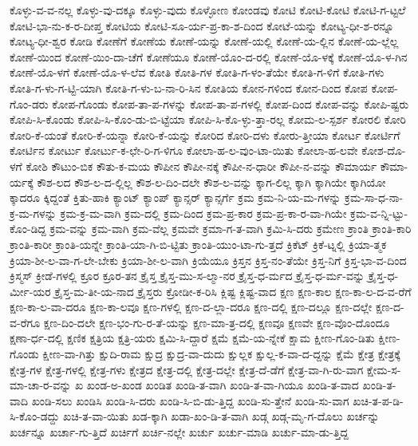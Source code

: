 {ಕೊಳ್ಳು-ವ-ವ-ನಲ್ಲ
ಕೊಳ್ಳು-ವು-ದಕ್ಕೂ
ಕೊಳ್ಳು-ವುದು
ಕೊಳ್ಳೋಣ
ಕೋಂಡವು
ಕೋಟಿ
ಕೋಟಿ-ಕೋಟಿ
ಕೋಟಿ-ಗ-ಟ್ಟಲೆ
ಕೋಟಿ-ಭಾ-ನು-ಕ-ರ-ದೀಪ್ತ
ಕೋಟಿಯ
ಕೋಟಿ-ಸೂ-ರ್ಯ-ಪ್ರ-ಕಾ-ಶ-ದಿಂದ
ಕೋಟೆ-ಯನ್ನು
ಕೋಟ್ಯ-ಧೀ-ಶ-ರನ್ನೂ
ಕೋಟ್ಯ-ಧೀ-ಶ್ವರ
ಕೋಡಿ
ಕೋಣೆಗೆ
ಕೋಣೆಯ
ಕೋಣೆ-ಯನ್ನು
ಕೋಣೆ-ಯಲ್ಲಿ
ಕೋಣೆ-ಯ-ಲ್ಲಿನ
ಕೋಣೆ-ಯ-ಲ್ಲೆಲ್ಲ
ಕೋಣೆ-ಯಿಂದ
ಕೋಣೆ-ಯಿಂ-ದಾ-ಚೆಗೆ
ಕೋಣೆಯೂ
ಕೋಣೆ-ಯೊಂ-ದ-ರಲ್ಲಿ
ಕೋಣೆ-ಯೊ-ಳಕ್ಕೆ
ಕೋಣೆ-ಯೊ-ಳ-ಗಿನ
ಕೋಣೆ-ಯೊ-ಳಗೆ
ಕೋಣೆ-ಯೊ-ಳ-ಲೆವ
ಕೋತಿ
ಕೋತಿ-ಗಳ
ಕೋತಿ-ಗ-ಳಂ-ತೆಯೇ
ಕೋತಿ-ಗ-ಳಿಗೆ
ಕೋತಿ-ಗಳು
ಕೋತಿ-ಗ-ಳು-ಗ-ಟ್ಟಿ-ಯಾಗಿ
ಕೋತಿ-ಗ-ಳು-ಬ-ನಾ-ರಿ-ಸಿನ
ಕೋತಿಯ
ಕೋನ-ಗಳಿಂದ
ಕೋನ-ದಿಂದ
ಕೋಪ
ಕೋಪ-ಗೊಂ-ಡರು
ಕೋಪ-ಗೊಂಡು
ಕೋಪ-ತಾ-ಪ-ಗಳನ್ನು
ಕೋಪ-ತಾ-ಪ-ಗಳಲ್ಲಿ
ಕೋಪ-ದಿಂದ
ಕೋಪ-ವನ್ನು
ಕೋಪಿ-ಷ್ಟರು
ಕೋಪಿ-ಸಿ-ಕೊಂಡು
ಕೋಪಿ-ಸಿ-ಕೊಂ-ಡು-ಬಿ-ಟ್ಟೆಯಾ
ಕೋಪಿ-ಸಿ-ಕೊ-ಳ್ಳು-ತ್ತಾ-ರಲ್ಲ
ಕೋಮ-ಲ-ಸ್ಪರ್ಶ
ಕೋರಲಿ
ಕೋರಿ
ಕೋರಿ-ಕೆ-ಯಂತೆ
ಕೋರಿ-ಕೆ-ಯನ್ನಾ
ಕೋರಿ-ಕೆ-ಯನ್ನು
ಕೋರಿದ
ಕೋರಿ-ದಳು
ಕೋರು-ತ್ತೀಯಾ
ಕೋರ್ಟ
ಕೋರ್ಟಿಗೆ
ಕೋರ್ಟಿನ
ಕೋರ್ಟು
ಕೋರ್ಟು-ಕ-ಛೇ-ರಿ-ಗ-ಳಿಗೂ
ಕೋಲಾ-ಹ-ಲ-ವುಂ-ಟಾ-ಯಿತು
ಕೋಲಾ-ಹ-ಲವೇ
ಕೋಶ-ದೊ-ಳಗೆ
ಕೋಶಿ
ಕೌಟುಂ-ಬಿಕ
ಕೌತು-ಕ-ಮಯ
ಕೌಪೀನ
ಕೌಪೀ-ನಕ್ಕೆ
ಕೌಪೀ-ನ-ಧಾರೀ
ಕೌಪೀ-ನ-ವನ್ನು
ಕೌಮಾರ್ಯ
ಕೌಮಾ-ರ್ಯಕ್ಕೆ
ಕೌಶ-ಲದ
ಕೌಶ-ಲ-ದ-ಲ್ಲಿಲ್ಲ
ಕೌಶ-ಲ-ದಿಂ-ದಲೇ
ಕೌಶ-ಲ-ವನ್ನು
ಕ್ಕಾಗ-ಲಿಲ್ಲ
ಕ್ಕಾಗಿ
ಕ್ಕಾಗಿಯೇ
ಕ್ಕಾಗಿಯೋ
ಕ್ಕಾದರೂ
ಕ್ಕಿದ್ದಂತೆ
ಕ್ತಿತು-ಹಾಕಿ
ಕ್ಯಾಂಟ್
ಕ್ಯಾಂಪ್
ಕ್ಯಾನ್ಸರ್
ಕ್ಯಾನ್ಸರ್ಗೆ
ಕ್ರಮ
ಕ್ರಮ-ನಿ-ಯ-ಮ-ಗಳನ್ನು
ಕ್ರಮ-ಸಾ-ಧ-ನಾ-ಕ್ರ-ಮ-ಗಳನ್ನು
ಕ್ರಮ-ಕ್ರ-ಮ-ವಾಗಿ
ಕ್ರಮ-ದಲ್ಲಿ
ಕ್ರಮ-ದಿಂದ
ಕ್ರಮ-ಪ್ರ-ಕಾರ
ಕ್ರಮ-ಪ್ರ-ಕಾ-ರ-ವಾ-ಗಿಯೇ
ಕ್ರಮ-ವ-ನ್ನಿ-ಟ್ಟು-ಕೊಂ-ಡಿದ್ದ
ಕ್ರಮ-ವನ್ನು
ಕ್ರಮ-ವಾಗಿ
ಕ್ರಮ-ವೆಲ್ಲ
ಕ್ರಮವೇ
ಕ್ರಮಾ-ಗ-ತ-ವಾಗಿ
ಕ್ರಮಿ-ಸಿ-ದರು
ಕ್ರಮೇಣ
ಕ್ರಾಂತಿ
ಕ್ರಾಂತಿ-ಕಾರಿ
ಕ್ರಾಂತಿ-ಕಾರೀ
ಕ್ರಾಂತಿ-ಯನ್ನೇ
ಕ್ರಾಂತಿ-ಯಾ-ಗಿ-ಬಿ-ಟ್ಟಿತು
ಕ್ರಾಂತಿ-ಯುಂ-ಟಾ-ಗು-ತ್ತದೆ
ಕ್ರಿಕೆಟ್
ಕ್ರಿಕೆ-ಟ್ನಲ್ಲಿ
ಕ್ರಿಯಾ-ತ್ಮಕ
ಕ್ರಿಯಾ-ಶೀ-ಲ-ವಾ-ಗ-ಲೇ-ಬೇಕು
ಕ್ರಿಯಾ-ಶೀ-ಲ-ವಾಗಿ
ಕ್ರಿಯೆಯೂ
ಕ್ರಿಸ್ತನ
ಕ್ರಿಸ್ತ-ನಂ-ತೆಯೇ
ಕ್ರಿಸ್ತ-ನಿಗೆ
ಕ್ರಿಸ್ತ-ಭಾ-ವ-ದಿಂದ
ಕ್ರಿಸ್ಮಸ್
ಕ್ರೀಡೆ-ಗಳಲ್ಲಿ
ಕ್ರೂರ
ಕ್ರೂರ-ತನ
ಕ್ರೈಸ್ತ
ಕ್ರೈಸ್ತ-ಮು-ಸ-ಲ್ಮಾ-ನರ
ಕ್ರೈಸ್ತ-ಧ-ರ್ಮದ
ಕ್ರೈಸ್ತ-ಧ-ರ್ಮ-ವನ್ನು
ಕ್ರೈಸ್ತ-ಧ-ರ್ಮೀ-ಯರ
ಕ್ರೈಸ್ತ-ಮ-ತೀ-ಯ-ನಾದ
ಕ್ರೈಸ್ತರು
ಕ್ರೋಡೀ-ಕ-ರಿಸಿ
ಕ್ಲಿಷ್ಟ
ಕ್ಲಿಷ್ಟ-ವಾದ
ಕ್ಷಣ
ಕ್ಷಣ-ಕಾಲ
ಕ್ಷಣ-ಕಾ-ಲ-ದ-ವ-ರೆಗೆ
ಕ್ಷಣ-ಕಾ-ಲ-ವಾ-ದರೂ
ಕ್ಷಣ-ಕಾ-ಲವೂ
ಕ್ಷಣ-ಗಳಲ್ಲಿ
ಕ್ಷಣ-ದ-ಲ್ಲಾ-ದರೂ
ಕ್ಷಣ-ದಲ್ಲಿ
ಕ್ಷಣ-ದಲ್ಲೂ
ಕ್ಷಣ-ದಲ್ಲೇ
ಕ್ಷಣ-ದ-ವ-ರೆಗೂ
ಕ್ಷಣ-ದಿಂ-ದಲೇ
ಕ್ಷಣ-ಭಂ-ಗು-ರ-ತೆ-ಯನ್ನು
ಕ್ಷಣ-ಮಾ-ತ್ರ-ದಲ್ಲಿ
ಕ್ಷಣವೂ
ಕ್ಷಣವೇ
ಕ್ಷಣ-ವೊಂ-ದೊಂದೂ
ಕ್ಷಣಾ-ರ್ಧ-ದಲ್ಲಿ
ಕ್ಷಣಿಕ
ಕ್ಷತ್ರಿಯ
ಕ್ಷತ್ರಿ-ಯರು
ಕ್ಷಮಿ-ಸಿ-ದ್ದಾರೆ
ಕ್ಷಮೆ
ಕ್ಷಮೆ-ಯ-ನ್ನೇಕೆ
ಕ್ಷಾಮ
ಕ್ಷೀಣ-ಗೊಂ-ಡಿತು
ಕ್ಷೀಣ-ಗೊಂಡು
ಕ್ಷೀಣ-ವಾ-ಗಿತ್ತು
ಕ್ಷುದಿ-ರಾಮ
ಕ್ಷುದ್ರ
ಕ್ಷುದ್ರ-ವಾ-ದುದು
ಕ್ಷುಲ್ಲಕ
ಕ್ಷುಲ್ಲ-ಕ-ವಾ-ದ-ದ್ದನ್ನು
ಕ್ಷೆಮೆ
ಕ್ಷೇತ್ರ
ಕ್ಷೇತ್ರಕ್ಕೆ
ಕ್ಷೇತ್ರ-ಗಳ
ಕ್ಷೇತ್ರ-ಗಳಲ್ಲಿ
ಕ್ಷೇತ್ರ-ಗಳು
ಕ್ಷೇತ್ರದ
ಕ್ಷೇತ್ರ-ದಲ್ಲಿ
ಕ್ಷೇತ್ರ-ದಲ್ಲೇ
ಕ್ಷೇತ್ರ-ದೆ-ಡೆಗೆ
ಕ್ಷೇತ್ರ-ವಾ-ಗಿ-ರು-ವಾಗ
ಕ್ಷೇಮ-ಸ-ಮಾ-ಚಾ-ರ-ವನ್ನು
ಖ
ಖಂಡ-ಅ-ಖಂಡ
ಖಂಡಿತ
ಖಂಡಿ-ತ-ವಾಗಿ
ಖಂಡಿ-ತ-ವಾ-ಗಿಯೂ
ಖಂಡಿ-ತ-ವಾದ
ಖಂಡಿ-ತ-ವಾದಿ
ಖಂಡಿ-ಸಲು
ಖಂಡಿಸಿ
ಖಂಡಿ-ಸಿ-ದರು
ಖಂಡಿ-ಸಿ-ಬಿ-ಡು-ತ್ತಿದ್ದ
ಖಂಡಿ-ಸು-ತ್ತೇನೆ
ಖಂಡಿ-ಸು-ವಾಗ
ಖಚಿ-ತ-ಪ-ಡಿ-ಸಿ-ಕೊಂ-ಡದ್ದು
ಖಚಿ-ತ-ವಾ-ಯಿತು
ಖಡ-ಕ್ಕಾಗಿ
ಖಡಾ-ಖಂ-ಡಿ-ತ-ವಾಗಿ
ಖಡ್ಗ
ಖಡ್ಗ-ಮೃ-ಗ-ದೊಲು
ಖರ್ಚನ್ನು
ಖರ್ಚನ್ನೂ
ಖರ್ಚಾ-ಗು-ತ್ತಿದೆ
ಖರ್ಚಿಗೆ
ಖರ್ಚಿ-ನಲ್ಲೇ
ಖರ್ಚು
ಖರ್ಚು-ಮಾಡಿ
ಖರ್ಚು-ಮಾ-ಡು-ತ್ತಿದ್ದ
}
